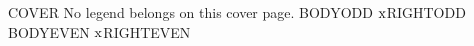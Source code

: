 \documentclass[a4paper,11pt,twoside]{article}
\begin{document}
\FixtureTargets
\noindent COVER No legend belongs on this cover page.
\newpage
\setcounter{page}{1}
\noindent BODYODD \(\FixtureUse{alpha}\)\hfill RIGHTODD
\newpage
\noindent BODYEVEN \(\FixtureUse{alpha}\)\hfill RIGHTEVEN
\end{document}
